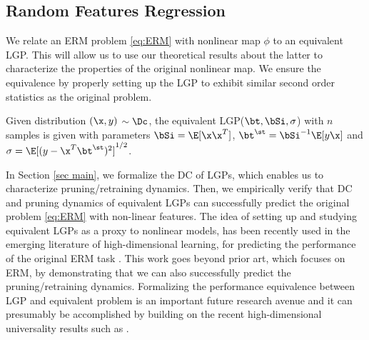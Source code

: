 \subsection{Random Features Regression} We relate an ERM problem \eqref{eq:ERM} with nonlinear map $\phi$ to an equivalent LGP. This will allow us to use our theoretical results about the latter to characterize the properties of the original nonlinear map. We ensure the equivalence by properly setting up the LGP to exhibit similar second order statistics as the original problem.
\begin{definition} Given distribution $(\x,y)$ $\sim\Dc$, the equivalent LGP($\bt,\bSi,\sigma$) with $n$ samples is given with parameters $\bSi=\E[\x\x^T]$, $\bt^\st=\bSi^{-1}\E[y\x]$ and $\sigma=\E[(y-\x^T\bt^\st)^2]^{1/2}$. 
\end{definition}
In Section \ref{sec main}, we formalize the DC of LGPs, which enables us to characterize pruning/retraining dynamics. Then, we empirically verify that DC and pruning dynamics of equivalent LGPs can successfully predict the original problem \eqref{eq:ERM} with non-linear features. The idea of setting up and studying equivalent LGPs as a proxy to nonlinear models, has been recently used in the emerging literature of high-dimensional learning, for predicting the performance of the original ERM task \cite{montanari2019generalization,goldt2020gaussian,abbasi2019universality,derezinski2019exact}. This work goes beyond prior art, which focuses on ERM, by demonstrating that we can also successfully predict the pruning/retraining dynamics. Formalizing the performance equivalence between LGP and equivalent problem is an important future research avenue and it can presumably be accomplished by building on the recent high-dimensional universality results such as \cite{oymak2018universality,hu2020universality,abbasi2019universality,goldt2020gaussian}.



